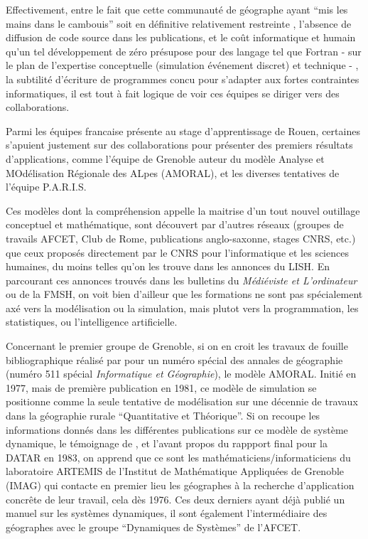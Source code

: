 Effectivement, entre le fait que cette communauté de géographe ayant \enquote{mis les mains dans le cambouis} soit en définitive relativement restreinte , l'absence de diffusion de code source dans les publications, et le coût informatique et humain qu'un tel développement de zéro présupose pour des langage tel que Fortran - sur le plan de l'expertise conceptuelle (simulation événement discret) et technique - , la subtilité d'écriture de programmes concu pour s'adapter aux fortes contraintes informatiques, il est tout à fait logique de voir ces équipes se diriger vers des collaborations. %

Parmi les équipes francaise présente au stage d'apprentissage de Rouen, certaines s'apuient justement sur des collaborations pour présenter des premiers résultats d'applications, comme l’équipe de Grenoble auteur du modèle Analyse et MOdélisation Régionale des ALpes (AMORAL), et les diverses tentatives de l’équipe P.A.R.I.S.  %

Ces modèles dont la compréhension appelle la maitrise d'un tout nouvel outillage conceptuel et mathématique, sont découvert par d'autres réseaux (groupes de travails AFCET, Club de Rome, publications anglo-saxonne, stages CNRS, etc.) que ceux proposés directement par le CNRS pour l'informatique et les sciences humaines, du moins telles qu'on les trouve dans les annonces du LISH. En parcourant ces annonces trouvés dans les bulletins du \textit{Médiéviste et L'ordinateur} ou de la FMSH, on voit bien d'ailleur que les formations ne sont pas spécialement axé vers la modélisation ou la simulation, mais plutot vers la programmation, les statistiques, ou l'intelligence artificielle.

Concernant le premier groupe de Grenoble, si on en croit les travaux de fouille bibliographique réalisé par \textcite{Rey1983} pour un numéro spécial des annales de géographie (numéro 511 spécial \textit{Informatique et Géographie}), le modèle AMORAL. Initié en 1977, mais de première publication en 1981, ce modèle de simulation se positionne comme la seule tentative de modélisation sur une décennie de travaux dans la géographie rurale \enquote{Quantitative et Théorique}. Si on recoupe les informations donnés dans les différentes publications sur ce modèle de système dynamique, le témoignage de \textcite{LeBerre1987}, et l'avant propos du rappport final pour la DATAR en 1983, on apprend  que ce sont les mathématiciens/informaticiens du laboratoire ARTEMIS de l’Institut de Mathématique Appliquées de Grenoble (IMAG) qui contacte en premier lieu les géographes à la recherche d’application concrête de leur travail, cela dès 1976. Ces deux derniers ayant déjà publié un manuel sur les systèmes dynamiques, il sont également l'intermédiaire des géographes avec le groupe \enquote{Dynamiques de Systèmes} de l'AFCET.

